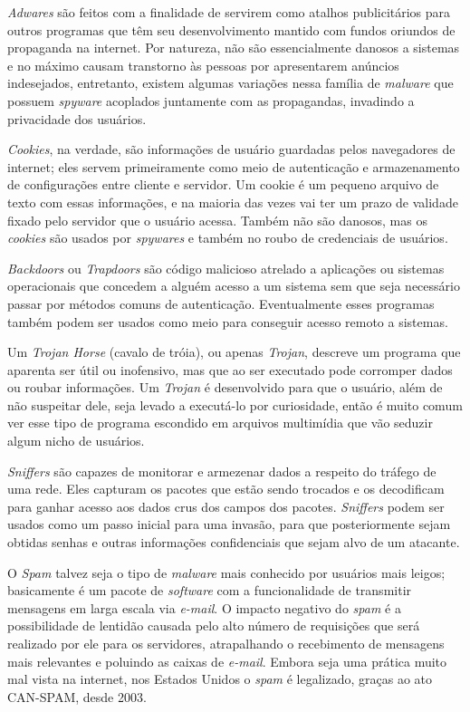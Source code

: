 \textit{Adwares} são feitos com a finalidade de servirem como atalhos publicitários
para outros programas que têm seu desenvolvimento mantido com fundos oriundos
de propaganda na internet. Por natureza, não são essencialmente danosos a
sistemas e no máximo causam transtorno às pessoas por apresentarem anúncios
indesejados, entretanto, existem algumas variações nessa família de \textit{malware}
que possuem \textit{spyware} acoplados juntamente com as propagandas, invadindo a
privacidade dos usuários.

\textit{Cookies}, na verdade, são informações de usuário guardadas pelos navegadores de
internet; eles servem primeiramente como meio de autenticação e armazenamento
de configurações entre cliente e servidor. Um cookie é um pequeno arquivo de
texto com essas informações, e na maioria das vezes vai ter um prazo de
validade fixado pelo servidor que o usuário acessa. Também não são danosos,
mas os \textit{cookies} são usados por \textit{spywares} e também no roubo de credenciais de
usuários.

\textit{Backdoors} ou \textit{Trapdoors} são código malicioso atrelado a aplicações ou sistemas
operacionais que concedem a alguém acesso a um sistema sem que seja necessário
passar por métodos comuns de autenticação. Eventualmente esses programas
também podem ser usados como meio para conseguir acesso remoto a sistemas.

Um \textit{Trojan Horse} (cavalo de tróia), ou apenas \textit{Trojan}, descreve um programa que
aparenta ser útil ou inofensivo, mas que ao ser executado pode corromper dados
ou roubar informações. Um \textit{Trojan} é desenvolvido para que o usuário, além de
não suspeitar dele, seja levado a executá-lo por curiosidade, então é muito
comum ver esse tipo de programa escondido em arquivos multimídia que vão
seduzir algum nicho de usuários.

\textit{Sniffers} são capazes de monitorar e armezenar dados a respeito do tráfego de
uma rede. Eles capturam os pacotes que estão sendo trocados e os decodificam
para ganhar acesso aos dados crus dos campos dos pacotes. \textit{Sniffers} podem ser
usados como um passo inicial para uma invasão, para que posteriormente sejam
obtidas senhas e outras informações confidenciais que sejam alvo de um
atacante.

O \textit{Spam} talvez seja o tipo de \textit{malware} mais conhecido por usuários mais leigos;
basicamente é um pacote de \textit{software} com a funcionalidade de transmitir
mensagens em larga escala via \textit{e-mail}. O impacto negativo do \textit{spam} é a
possibilidade de lentidão causada pelo alto número de requisições que será
realizado por ele para os servidores, atrapalhando o recebimento de mensagens
mais relevantes e poluindo as caixas de \textit{e-mail}. Embora seja uma prática muito
mal vista na internet, nos Estados Unidos o \textit{spam} é legalizado, graças ao ato
CAN-SPAM, desde 2003.

